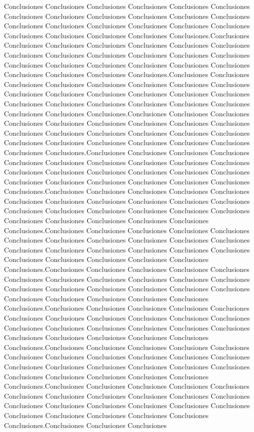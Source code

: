 Conclusiones Conclusiones Conclusiones Conclusiones Conclusiones Conclusiones Conclusiones Conclusiones Conclusiones Conclusiones Conclusiones Conclusiones Conclusiones Conclusiones Conclusiones Conclusiones Conclusiones Conclusiones Conclusiones Conclusiones Conclusiones Conclusiones Conclusiones.Conclusiones Conclusiones Conclusiones Conclusiones Conclusiones Conclusiones Conclusiones Conclusiones Conclusiones Conclusiones Conclusiones Conclusiones Conclusiones Conclusiones Conclusiones Conclusiones Conclusiones Conclusiones Conclusiones Conclusiones Conclusiones Conclusiones Conclusiones.Conclusiones Conclusiones Conclusiones Conclusiones Conclusiones Conclusiones Conclusiones Conclusiones Conclusiones Conclusiones Conclusiones Conclusiones Conclusiones Conclusiones Conclusiones Conclusiones Conclusiones Conclusiones Conclusiones Conclusiones Conclusiones Conclusiones Conclusiones.Conclusiones Conclusiones Conclusiones Conclusiones Conclusiones Conclusiones Conclusiones Conclusiones Conclusiones Conclusiones Conclusiones Conclusiones Conclusiones Conclusiones Conclusiones Conclusiones Conclusiones Conclusiones Conclusiones Conclusiones Conclusiones Conclusiones Conclusiones.Conclusiones Conclusiones Conclusiones Conclusiones Conclusiones Conclusiones Conclusiones Conclusiones Conclusiones Conclusiones Conclusiones Conclusiones Conclusiones Conclusiones Conclusiones Conclusiones Conclusiones Conclusiones Conclusiones Conclusiones Conclusiones Conclusiones Conclusiones.Conclusiones Conclusiones Conclusiones Conclusiones Conclusiones Conclusiones Conclusiones Conclusiones Conclusiones Conclusiones Conclusiones Conclusiones Conclusiones Conclusiones Conclusiones Conclusiones Conclusiones Conclusiones Conclusiones Conclusiones Conclusiones Conclusiones Conclusiones.Conclusiones Conclusiones Conclusiones Conclusiones Conclusiones Conclusiones Conclusiones Conclusiones Conclusiones Conclusiones Conclusiones Conclusiones Conclusiones Conclusiones Conclusiones Conclusiones Conclusiones Conclusiones Conclusiones Conclusiones Conclusiones Conclusiones Conclusiones.Conclusiones Conclusiones Conclusiones Conclusiones Conclusiones Conclusiones Conclusiones Conclusiones Conclusiones Conclusiones Conclusiones Conclusiones Conclusiones Conclusiones Conclusiones Conclusiones Conclusiones Conclusiones Conclusiones Conclusiones Conclusiones Conclusiones Conclusiones.Conclusiones Conclusiones Conclusiones Conclusiones Conclusiones Conclusiones Conclusiones Conclusiones Conclusiones Conclusiones Conclusiones Conclusiones Conclusiones Conclusiones Conclusiones Conclusiones Conclusiones Conclusiones Conclusiones Conclusiones Conclusiones Conclusiones Conclusiones.Conclusiones Conclusiones Conclusiones Conclusiones Conclusiones Conclusiones Conclusiones Conclusiones Conclusiones Conclusiones Conclusiones Conclusiones Conclusiones Conclusiones Conclusiones Conclusiones Conclusiones Conclusiones Conclusiones Conclusiones Conclusiones Conclusiones Conclusiones.Conclusiones Conclusiones Conclusiones Conclusiones Conclusiones Conclusiones Conclusiones Conclusiones Conclusiones Conclusiones Conclusiones Conclusiones Conclusiones Conclusiones Conclusiones Conclusiones Conclusiones Conclusiones Conclusiones Conclusiones Conclusiones Conclusiones Conclusiones.Conclusiones Conclusiones Conclusiones 
